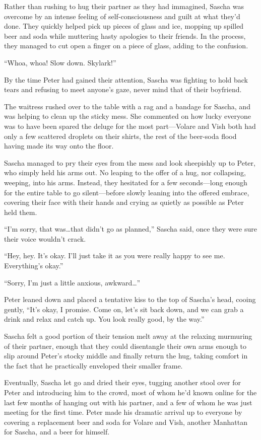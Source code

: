Rather than rushing to hug their partner as they had immagined, Sascha was overcome by an intense feeling of self-consciousness and guilt at what they'd done. They quickly helped pick up pieces of glass and ice, mopping up spilled beer and soda while muttering hasty apologies to their friends. In the process, they managed to cut open a finger on a piece of glass, adding to the confusion.

``Whoa, whoa! Slow down. Skylark!''

By the time Peter had gained their attention, Sascha was fighting to hold back tears and refusing to meet anyone's gaze, never mind that of their boyfriend.

The waitress rushed over to the table with a rag and a bandage for Sascha, and was helping to clean up the sticky mess. She commented on how lucky everyone was to have been spared the deluge for the most part---Volare and Vish both had only a few scattered droplets on their shirts, the rest of the beer-soda flood having made its way onto the floor.

Sascha managed to pry their eyes from the mess and look sheepishly up to Peter, who simply held his arms out. No leaping to the offer of a hug, nor collapsing, weeping, into his arms. Instead, they hesitated for a few seconds---long enough for the entire table to go silent---before slowly leaning into the offered embrace, covering their face with their hands and crying as quietly as possible as Peter held them.

``I'm sorry, that was\ldots{}that didn't go as planned,'' Sascha said, once they were sure their voice wouldn't crack.

``Hey, hey. It's okay. I'll just take it as you were really happy to see me. Everything's okay.''

``Sorry, I'm just a little anxious, awkward\ldots{}''

Peter leaned down and placed a tentative kiss to the top of Sascha's head, cooing gently, ``It's okay, I promise. Come on, let's sit back down, and we can grab a drink and relax and catch up. You look really good, by the way.''

Sascha felt a good portion of their tension melt away at the relaxing murmuring of their partner, enough that they could disentangle their own arms enough to slip around Peter's stocky middle and finally return the hug, taking comfort in the fact that he practically enveloped their smaller frame.

Eventually, Sascha let go and dried their eyes, tugging another stool over for Peter and introducing him to the crowd, most of whom he'd known online for the last few months of hanging out with his partner, and a few of whom he was just meeting for the first time. Peter made his dramatic arrival up to everyone by covering a replacement beer and soda for Volare and Vish, another Manhattan for Sascha, and a beer for himself.

